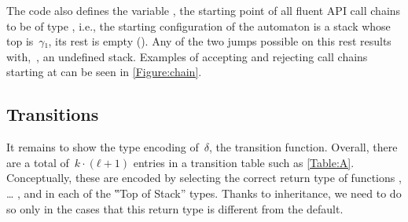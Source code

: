 The code also defines the  variable , the starting point
of all fluent API call chains to be of type , i.e.,
  the starting configuration of the automaton is a stack whose top is~$γ₁$,
  its rest is empty ().
Any of the two jumps possible on this rest results with,~,
  an undefined stack.
Examples of accepting and rejecting call chains starting at 
  can be seen in \cref{Figure:chain}.

\subsection{Transitions}
It remains to show the type encoding of~$δ$,
  the transition function.
Overall, there are a total of~$k·(ℓ+1)$
  entries in a transition table such as \cref{Table:A}.
Conceptually, these are encoded by selecting the correct return
  type of functions , … , and \cc{\$()} in each of the ‟Top of Stack” types.
Thanks to inheritance, we need to do so only in the cases that this return type is different from the
  default.

